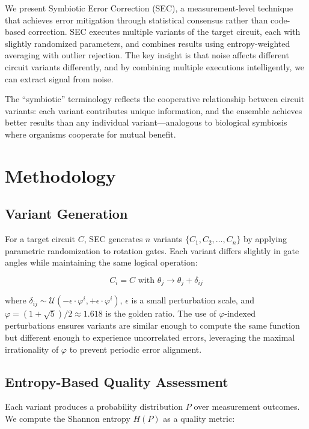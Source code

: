 \documentclass[twocolumn,preprintnumbers,amsmath,amssymb,prl]{revtex4-2}
\begin{document}
We present Symbiotic Error Correction (SEC), a measurement-level technique that achieves error mitigation through statistical consensus rather than code-based correction. SEC executes multiple variants of the target circuit, each with slightly randomized parameters, and combines results using entropy-weighted averaging with outlier rejection. The key insight is that noise affects different circuit variants differently, and by combining multiple executions intelligently, we can extract signal from noise.

The ``symbiotic'' terminology reflects the cooperative relationship between circuit variants: each variant contributes unique information, and the ensemble achieves better results than any individual variant---analogous to biological symbiosis where organisms cooperate for mutual benefit.

\section{Methodology}

\subsection{Variant Generation}

For a target circuit $C$, SEC generates $n$ variants $\{C_1, C_2, \ldots, C_n\}$ by applying parametric randomization to rotation gates. Each variant differs slightly in gate angles while maintaining the same logical operation:

\begin{equation}
C_i = C \text{ with } \theta_j \rightarrow \theta_j + \delta_{ij}
\end{equation}

where $\delta_{ij} \sim \mathcal{U}(-\epsilon \cdot \varphi^i, +\epsilon \cdot \varphi^i)$, $\epsilon$ is a small perturbation scale, and $\varphi = (1+\sqrt{5})/2 \approx 1.618$ is the golden ratio. The use of $\varphi$-indexed perturbations ensures variants are similar enough to compute the same function but different enough to experience uncorrelated errors, leveraging the maximal irrationality of $\varphi$ to prevent periodic error alignment.

\subsection{Entropy-Based Quality Assessment}

Each variant produces a probability distribution $P$ over measurement outcomes. We compute the Shannon entropy $H(P)$ as a quality metric:
\end{document}
